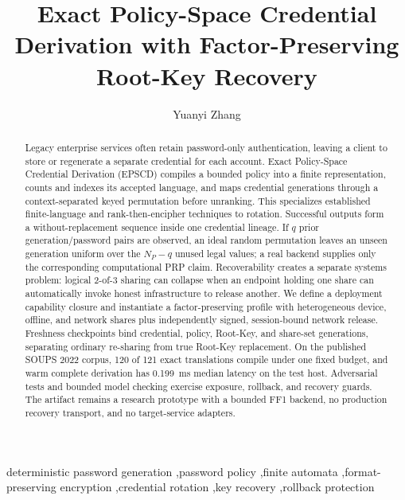 \documentclass[preprint,12pt]{elsarticle}
\begin{document}
\begin{frontmatter}

\title{Exact Policy-Space Credential Derivation with Factor-Preserving Root-Key Recovery}

\author{Yuanyi Zhang}
\address{Independent Researcher}

\begin{abstract}
Legacy enterprise services often retain password-only authentication, leaving
a client to store or regenerate a separate credential for each account. Exact
Policy-Space Credential Derivation (EPSCD) compiles a bounded policy into a
finite representation, counts and indexes its accepted language, and maps
credential generations through a context-separated keyed permutation before
unranking. This specializes established finite-language and rank-then-encipher
techniques to rotation. Successful outputs form a without-replacement sequence
inside one credential lineage. If $q$ prior generation/password pairs are
observed, an ideal random permutation leaves an unseen generation uniform over
the $N_P-q$ unused legal values; a real backend supplies only the corresponding
computational PRP claim. Recoverability creates a separate systems problem:
logical 2-of-3 sharing can collapse when an endpoint holding one share can
automatically invoke honest infrastructure to release another. We define a
deployment capability closure and instantiate a factor-preserving profile with
heterogeneous device, offline, and network shares plus independently signed,
session-bound network release. Freshness checkpoints bind credential, policy,
Root-Key, and share-set generations, separating ordinary re-sharing from true
Root-Key replacement. On the published SOUPS 2022 corpus, 120 of 121 exact
translations compile under one fixed budget, and warm complete derivation has
0.199~ms median latency on the test host. Adversarial tests and bounded model
checking exercise exposure, rollback, and recovery guards. The artifact remains
a research prototype with a bounded FF1 backend, no production recovery
transport, and no target-service adapters.
\end{abstract}

\begin{keyword}
deterministic password generation \sep password policy \sep finite automata
\sep format-preserving encryption \sep credential rotation \sep key recovery
\sep rollback protection
\end{keyword}

\end{frontmatter}
\end{document}
